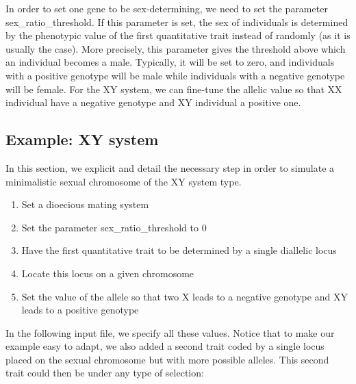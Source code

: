 \documentclass[letterpaper,12pt,oneside]{book}
\begin{document}
\begin{appendices}
In order to set one gene to be sex-determining, we need to set the parameter \textsf{sex\_ratio\_threshold}. If this parameter is set, the sex of individuals is determined by the phenotypic value of the first quantitative trait instead of randomly (as it is usually the case). More precisely, this parameter gives the threshold above which an individual becomes a male. Typically, it will be set to zero, and individuals with a positive genotype will be male while individuals with a negative genotype will be female. For the XY system, we can fine-tune the allelic value so that XX individual have a negative genotype and XY individual a positive one. 
\subsection{Example: XY system}
In this section, we explicit and detail the necessary step in order to simulate a minimalistic sexual chromosome of the XY system type.
\begin{enumerate}
\item    Set a dioecious mating system
\item   Set the parameter \textsf{sex\_ratio\_threshold} to 0
\item    Have the first quantitative trait to be determined by a single diallelic locus
\item    Locate this locus on a given chromosome
\item    Set the value of the allele so that two X leads to a negative genotype and XY leads to a positive genotype
\end{enumerate}
In the following input file, we specify all these values. Notice that to make our example easy to adapt, we also added a second trait coded by a single locus placed on the sexual chromosome but with more possible alleles.  This second trait could then be under any type of selection:


\end{appendices}
\end{document}
